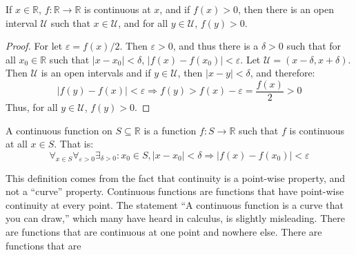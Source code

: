             \begin{theorem}
                If $x\in\mathbb{R}$,
                $f:\mathbb{R}\rightarrow\mathbb{R}$ is
                continuous at $x$, and if $f(x)>0$,
                then there is an open interval
                $\mathcal{U}$ such that $x\in\mathcal{U}$,
                and for all $y\in\mathcal{U}$, $f(y)>0$.
            \end{theorem}
            \begin{proof}
                For let $\varepsilon=f(x)/2$. Then
                $\varepsilon>0$, and thus there is a $\delta>0$
                such that for all $x_{0}\in\mathbb{R}$
                such that $|x-x_{0}|<\delta$,
                $|f(x)-f(x_{0})|<\varepsilon$. Let
                $\mathcal{U}=(x-\delta,x+\delta)$.
                Then $\mathcal{U}$ is an open intervals and if
                $y\in\mathcal{U}$, then $|x-y|<\delta$,
                and therefore:
                \begin{equation}
                    |f(y)-f(x)|<\varepsilon
                    \Rightarrow
                    f(y)>f(x)-\varepsilon
                    =\frac{f(x)}{2}>0
                \end{equation}
                Thus, for all $y\in\mathcal{U}$, $f(y)>0$.
            \end{proof}
            \begin{definition}
                A continuous function on
                $S\subseteq\mathbb{R}$ is a function
                $f:S\rightarrow\mathbb{R}$ such that
                $f$ is continuous at all $x\in{S}$. That is:
                \begin{equation}
                    \forall_{x\in{S}}\forall_{\varepsilon>0}
                    \exists_{\delta>0}:x_{0}\in{S},
                    |x-x_{0}|<\delta
                    \Rightarrow|f(x)-f(x_{0})|<\varepsilon
                \end{equation}
            \end{definition}
            This definition comes from the fact that
            continuity is a point-wise property, and not a
            ``curve'' property. Continuous functions are
            functions that have point-wise continuity at
            every point. The statement ``A continuous function
            is a curve that you can draw,'' which many have
            heard in calculus, is slightly misleading. There
            are functions that are continuous at one point and
            nowhere else. There are functions that are
